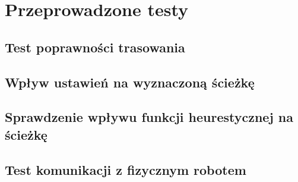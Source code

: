\section{Przeprowadzone testy}


\subsection{Test poprawności trasowania}

\subsection{Wpływ ustawień na wyznaczoną ścieżkę}

\subsection{Sprawdzenie wpływu funkcji heurestycznej na ścieżkę}

\subsection{Test komunikacji z fizycznym robotem}

